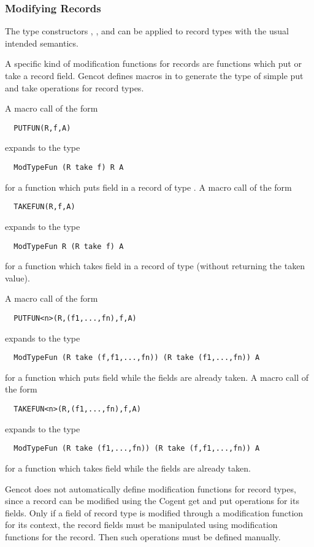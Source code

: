 \subsubsection{Modifying Records}

The type constructors , , and  can be applied to record types with the 
usual intended semantics. 

A specific kind of modification functions for records are functions which put or take a record field. 
Gencot defines macros in  to generate the type of simple put and take operations for
record types.

A macro call of the form 
\begin{verbatim}
  PUTFUN(R,f,A)
\end{verbatim}
expands to the type
\begin{verbatim}
  ModTypeFun (R take f) R A
\end{verbatim}
for a function which puts field  in a record of type . A macro call of the form
\begin{verbatim}
  TAKEFUN(R,f,A)
\end{verbatim}
expands to the type
\begin{verbatim}
  ModTypeFun R (R take f) A
\end{verbatim}
for a function which takes field  in a record of type  (without returning the taken value).

A macro call of the form 
\begin{verbatim}
  PUTFUN<n>(R,(f1,...,fn),f,A)
\end{verbatim}
expands to the type
\begin{verbatim}
  ModTypeFun (R take (f,f1,...,fn)) (R take (f1,...,fn)) A
\end{verbatim}
for a function which puts field  while the fields  are already taken. A macro call of the form
\begin{verbatim}
  TAKEFUN<n>(R,(f1,...,fn),f,A)
\end{verbatim}
expands to the type
\begin{verbatim}
  ModTypeFun (R take (f1,...,fn)) (R take (f,f1,...,fn)) A
\end{verbatim}
for a function which takes field  while the fields  are already taken.

Gencot does not automatically define modification functions for record types, since a record can be modified using the
Cogent get and put operations for its fields. Only if a field of record type is modified through a modification function for its context, the record fields
must be manipulated using modification functions for the record. Then such operations must be defined manually.

